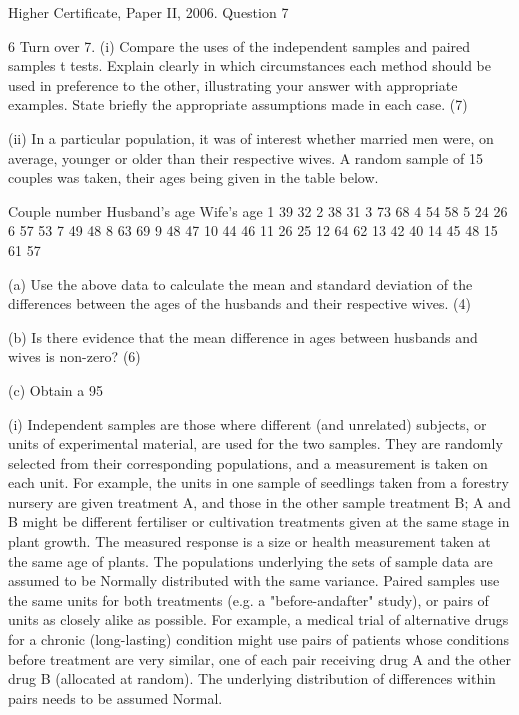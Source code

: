 \documentclass[a4paper,12pt]{article}
\begin{document}
Higher Certificate, Paper II, 2006.  Question 7 
\begin{framed}

6 
Turn over 
7. (i) Compare the uses of the independent samples and paired samples t tests.  Explain clearly in which circumstances each method should be used in preference to the other, illustrating your answer with appropriate examples.  State briefly the appropriate assumptions made in each case. (7) 
 
(ii) In a particular population, it was of interest whether married men were, on average, younger or older than their respective wives.  A random sample of 15 couples was taken, their ages being given in the table below. 
 
Couple number Husband's age Wife's age   1 39 32   2 38 31   3 73 68   4 54 58   5 24 26   6 57 53   7 49 48   8 63 69   9 48 47 10 44 46 11 26 25 12 64 62 13 42 40 14 45 48 15 61 57 
 
 
(a) Use the above data to calculate the mean and standard deviation of the differences between the ages of the husbands and their respective wives. (4) 
 
(b) Is there evidence that the mean difference in ages between husbands and wives is non-zero? (6) 
 
(c) Obtain a 95%
 
 
 
\end{framed}

 
(i) Independent samples are those where different (and unrelated) subjects, or units of experimental material, are used for the two samples.  They are randomly selected from their corresponding populations, and a measurement is taken on each unit.  For example, the units in one sample of seedlings taken from a forestry nursery are given treatment A, and those in the other sample treatment B;  A and B might be different fertiliser or cultivation treatments given at the same stage in plant growth.  The measured response is a size or health measurement taken at the same age of plants. 
 The populations underlying the sets of sample data are assumed to be Normally distributed with the same variance. 
 Paired samples use the same units for both treatments (e.g. a "before-andafter" study), or pairs of units as closely alike as possible.  For example, a medical trial of alternative drugs for a chronic (long-lasting) condition might use pairs of patients whose conditions before treatment are very similar, one of each pair receiving drug A and the other drug B (allocated at random). 
 The underlying distribution of differences within pairs needs to be assumed Normal. 
 
\end{document}
